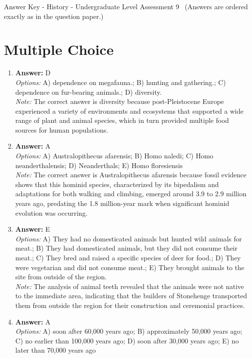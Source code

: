 \documentclass[12pt]{article}
\begin{document}
\begin{center}
Answer Key - History - Undergraduate Level Assessment 9 \
\small (Answers are ordered exactly as in the question paper.)
\end{center}

\section*{Multiple Choice}
\begin{enumerate}[label=\arabic*.]
\item \textbf{Answer:} D
\\ \textit{Options:} A) dependence on megafauna.; B) hunting and gathering.; C) dependence on fur-bearing animals.; D) diversity.
\\ \textit{Note:} The correct answer is diversity because post-Pleistocene Europe experienced a variety of environments and ecosystems that supported a wide range of plant and animal species, which in turn provided multiple food sources for human populations.
\item \textbf{Answer:} A
\\ \textit{Options:} A) Australopithecus afarensis; B) Homo naledi; C) Homo neanderthalensis; D) Neanderthals; E) Homo floresiensis
\\ \textit{Note:} The correct answer is Australopithecus afarensis because fossil evidence shows that this hominid species, characterized by its bipedalism and adaptations for both walking and climbing, emerged around 3.9 to 2.9 million years ago, predating the 1.8 million-year mark when significant hominid evolution was occurring.
\item \textbf{Answer:} E
\\ \textit{Options:} A) They had no domesticated animals but hunted wild animals for meat.; B) They had domesticated animals, but they did not consume their meat.; C) They bred and raised a specific species of deer for food.; D) They were vegetarian and did not consume meat.; E) They brought animals to the site from outside of the region.
\\ \textit{Note:} The analysis of animal teeth revealed that the animals were not native to the immediate area, indicating that the builders of Stonehenge transported them from outside the region for their construction and ceremonial practices.
\item \textbf{Answer:} A
\\ \textit{Options:} A) soon after 60,000 years ago; B) approximately 50,000 years ago; C) no earlier than 100,000 years ago; D) soon after 30,000 years ago; E) no later than 70,000 years ago

\end{enumerate}
\end{document}
